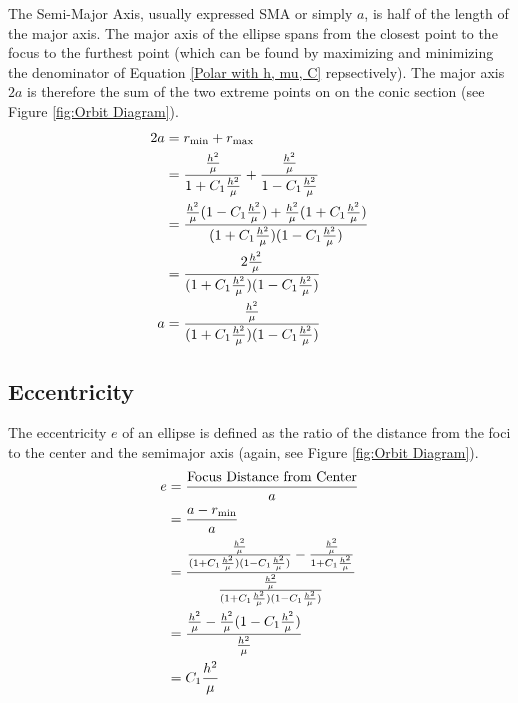 \documentclass[../basicOrbitalDynamics.tex]{subfiles}
\begin{document}
The Semi-Major Axis, usually expressed SMA or simply $a$, is half of the length of the major axis. The major axis of the ellipse spans from the closest point to the focus to the furthest point (which can be found by maximizing and minimizing the denominator of Equation \eqref{Polar with h, mu, C} repsectively). The major axis $2a$ is therefore the sum of the two extreme points on on the conic section (see Figure \ref{fig:Orbit Diagram}).
\begin{align*}
    2a & ={r}_\text{min}+{r}_\text{max}                                                                                                        \\
       & =\frac{\frac{h^2}{\mu}}{1+C_1\frac{h^2}{\mu}}+\frac{\frac{h^2}{\mu}}{1-C_1\frac{h^2}{\mu}}                                        \\
       & =\frac{\frac{h^2}{\mu}(1-C_1\frac{h^2}{\mu})+\frac{h^2}{\mu}(1+C_1\frac{h^2}{\mu})}{(1+C_1\frac{h^2}{\mu})(1-C_1\frac{h^2}{\mu})} \\
       & =\frac{2\frac{h^2}{\mu}}{(1+C_1\frac{h^2}{\mu})(1-C_1\frac{h^2}{\mu})}                                                            \\
    a  & =\frac{\frac{h^2}{\mu}}{(1+C_1\frac{h^2}{\mu})(1-C_1\frac{h^2}{\mu})}
\end{align*}

\subsection{Eccentricity}

The eccentricity $e$ of an ellipse is defined as the ratio of the distance from the foci to the center and the semimajor axis (again, see Figure \ref{fig:Orbit Diagram}).
\begin{align*}
    e & =\frac{\text{Focus Distance from Center}}{a}                                                                                                                                                    \\
      & =\frac{a-{r}_\text{min}}{a}                                                                                                                                                                       \\
      & =\frac{\frac{\frac{h^2}{\mu}}{(1+C_1\frac{h^2}{\mu})(1-C_1\frac{h^2}{\mu})}-\frac{\frac{h^2}{\mu}}{1+C_1\frac{h^2}{\mu}}}{\frac{\frac{h^2}{\mu}}{(1+C_1\frac{h^2}{\mu})(1-C_1\frac{h^2}{\mu})}} \\
      & =\frac{\frac{h^2}{\mu}-\frac{h^2}{\mu}(1-C_1\frac{h^2}{\mu})}{\frac{h^2}{\mu}}                                                                                                                  \\
      & =C_1\frac{h^2}{\mu}                                                                                                                                                                             \\ \\
\end{align*}
\end{document}
